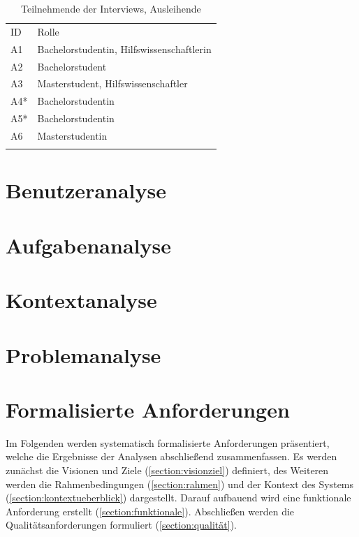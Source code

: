 \begin{table}[h]
    \centering 
    \caption{Teilnehmende der Interviews, Ausleihende}
    \begin{tabular}{ll}
        \arrayrulecolor{maincolor}\hline
        \sffamily\color{maincolor}ID & \sffamily\color{maincolor}Rolle \\
        \arrayrulecolor{maincolor}\hline
            A1  & Bachelorstudentin, Hilfswissenschaftlerin\\
            A2 &  Bachelorstudent\\
            A3  & Masterstudent, Hilfswissenschaftler \\
            A4*  & Bachelorstudentin \\
            A5*  & Bachelorstudentin \\
            A6  & Masterstudentin \\
        \arrayrulecolor{maincolor}\hline
    \end{tabular}
    \label{table:a}
    \hfill
    
\end{table}

\section{Benutzeranalyse}
\label{section:benutzer}

\section{Aufgabenanalyse}
\label{section:aufgaben}

\section{Kontextanalyse}
\label{section:kontext}

\section{Problemanalyse}
\label{section:iststand}



\section{Formalisierte Anforderungen}
\label{section:anforderung}

Im Folgenden werden systematisch formalisierte Anforderungen präsentiert, welche die Ergebnisse der Analysen abschließend zusammenfassen.
Es werden zunächst die Visionen und Ziele (\ref{section:visionziel}) definiert, des Weiteren werden
die Rahmenbedingungen (\ref{section:rahmen}) und der Kontext des Systems
(\ref{section:kontextueberblick}) dargestellt. Darauf aufbauend wird eine funktionale Anforderung
erstellt (\ref{section:funktionale}). Abschließen werden die Qualitätsanforderungen formuliert
(\ref{section:qualität}).


